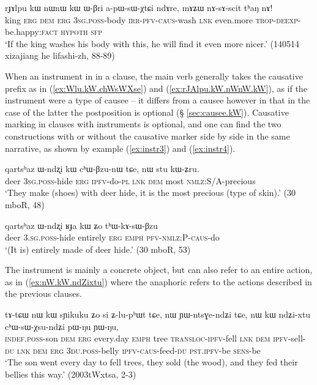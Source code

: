 \begin{exe}
\ex \label{ex:rJAlpu.kW.nWnW.kW}
 \gll  rɟɤlpu kɯ nɯnɯ kɯ ɯ-βri a-pɯ-sɯ-χtɕi ndɤre, mɤʑɯ nɤ-sɤ-scit tʰaŋ nɤ!\\
 king \textsc{erg} \textsc{dem} \textsc{erg} \textsc{3sg}.\textsc{poss}-body \textsc{irr}-\textsc{pfv}-\textsc{caus}-wash \textsc{lnk} even.more \textsc{trop}-\textsc{deexp}-be.happy:\textsc{fact} \textsc{hypoth} \textsc{sfp} \\
 \glt `If the king washes his body with this, he will find it even more nicer.' (140514 xizajiang he lifashi-zh, 88-89)
\end{exe}

When an instrument in  in a clause, the main verb generally takes the causative prefix as in (\ref{ex:Wlu.kW.chWsWXse}) and (\ref{ex:rJAlpu.kW.nWnW.kW}), as if the instrument were a type of causee -- it differs from a causee however in that in the case of the latter the postposition  is optional (§ \ref{sec:causee.kW}). Causative marking in clauses with  instruments is optional, and one can find the two constructions with or without the causative marker side by side in the same narrative, as shown by example (\ref{ex:instr3}) and (\ref{ex:instr4}).

\begin{exe} 
\ex \label{ex:instr3}
\gll   qartsʰaz  ɯ-ndʐi kɯ cʰɯ-βzu-nɯ tɕe, nɯ stu kɯ-ʑru.   \\
 deer \textsc{3sg.poss}-hide \textsc{erg} \textsc{ipfv}-do-\textsc{pl} \textsc{lnk} \textsc{dem} most \textsc{nmlz:S/A}-precious \\
 \glt   `They make (shoes) with deer hide, it is the most precious (type of skin).' (30 mboR, 48)
\end{exe} 

 \begin{exe} 
\ex \label{ex:instr4}
\gll   qartsʰaz ɯ-ndʐi ʁɟa kɯ ʑo tʰɯ-kɤ-sɯ-βzu  \\
 deer \textsc{3.sg.poss}-hide entirely \textsc{erg} \textsc{emph} \textsc{pfv-nmlz:P-caus}-do\\
 \glt   `(It is) entirely made of deer hide.' (30 mboR, 53)
\end{exe} 

The instrument is mainly a concrete object, but can also refer to an entire action, as in (\ref{ex:nW.kW.ndZixtu}) where the anaphoric  refers to the actions described in the previous clauses.

\begin{exe}
\ex \label{ex:nW.kW.ndZixtu}
 \gll tɤ-tɕɯ nɯ kɯ sɲikuku ʑo si ʑ-lu-pʰɯt tɕe, nɯ ɲɯ-ntsɣe-ndʑi tɕe,  nɯ kɯ ndʑi-xtu cʰɯ-sɯ-χsu-ndʑi pɯ-ŋu ɲɯ-ŋu,  \\
 \textsc{indef}.\textsc{poss}-son \textsc{dem} \textsc{erg} every.day \textsc{emph} tree \textsc{transloc}-\textsc{ipfv}-fell \textsc{lnk} \textsc{dem} \textsc{ipfv}-sell-\textsc{du} \textsc{lnk} \textsc{dem} \textsc{erg} \textsc{3du}.\textsc{poss}-belly \textsc{ipfv}-\textsc{caus}-feed-\textsc{du} \textsc{pst}.\textsc{ipfv}-be \textsc{sens}-be \\
 \glt `The son went every day to fell trees, they sold (the wood), and they fed their bellies this way.' (2003tWxtsa, 2-3)
\end{exe}

